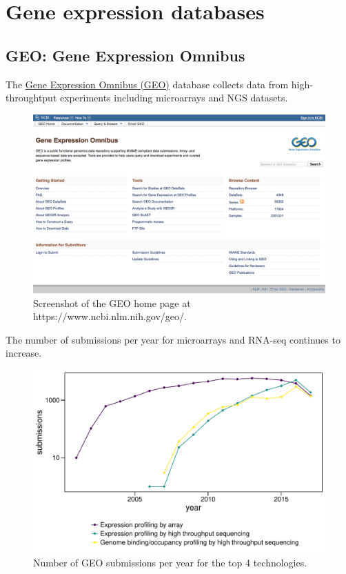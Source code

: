 \documentclass[]{book}
\theoremstyle{definition}
\theoremstyle{definition}
\theoremstyle{definition}
\theoremstyle{remark}
\begin{document}
\section{Gene expression databases}\label{gene-expression-databases}

\subsection{GEO: Gene Expression
Omnibus}\label{geo-gene-expression-omnibus}

The \href{https://www.ncbi.nlm.nih.gov/geo/}{Gene Expression Omnibus
(GEO)} database collects data from high-throughtput experiments
including microarrays and NGS datasets.

\begin{figure}
\includegraphics[width=16.38in]{pic/geo_web} \caption{Screenshot of the GEO home page at https://www.ncbi.nlm.nih.gov/geo/.}\label{fig:geo-web}
\end{figure}

The number of submissions per year for microarrays and RNA-seq continues
to increase.

\begin{figure}
\centering
\includegraphics{pic/geo_year.pdf}
\caption{\label{fig:geo-year}Number of GEO submissions per year for the top
4 technologies.}
\end{figure}
\end{document}

